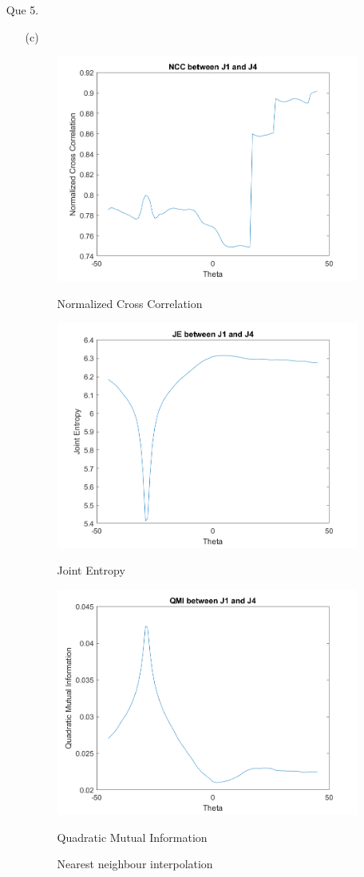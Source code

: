 \documentclass[11pt]{article}
\begin{document}
\maketitle

\begin{enumerate}
\item[Que 5.]
\begin{enumerate}

\item[(c)] \
\begin{figure}[!htb]
\centering
{}
  \includegraphics[width=100mm]{../images/NCC.png}
  \caption*{Normalized Cross Correlation}
  \endminipage\hfill
 \includegraphics[width=100mm]{../images/JE.png}
  \caption*{Joint Entropy}
    \endminipage\hfill
  \includegraphics[width=100mm]{../images/QMI.png}
  \caption*{Quadratic Mutual Information}
  \endminipage\hfill
\caption{Nearest neighbour interpolation}
\end{figure}


\end{enumerate}
\end{enumerate}
\end{document}
